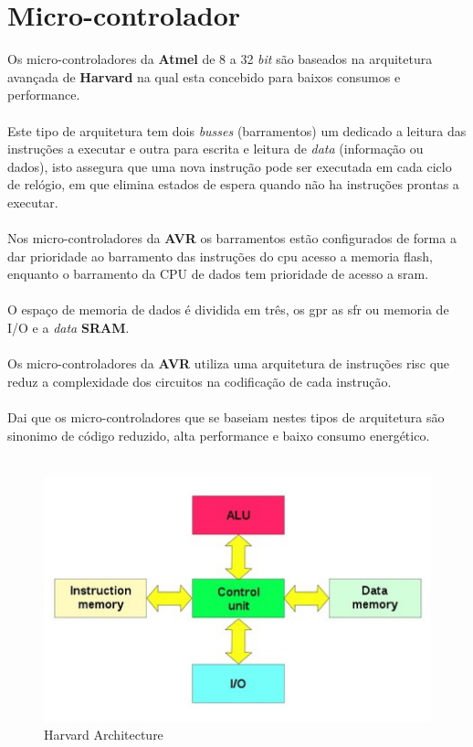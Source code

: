 \section{Micro-controlador}
Os micro-controladores da \textbf{Atmel} de 8 a 32 \textit{bit} são baseados na arquitetura avançada de \textbf{Harvard} na qual esta concebido para baixos consumos e performance.
\\
\\
Este tipo de arquitetura tem dois  \textit{busses} (barramentos) um dedicado a leitura das instruções a executar e outra para escrita e leitura de \textit{data} (informação ou dados), isto assegura que uma nova instrução pode ser executada em cada ciclo de relógio, em que elimina estados de espera quando não ha instruções prontas a executar.
\\
\\
Nos micro-controladores da \textbf{AVR} os barramentos estão configurados de forma a dar prioridade ao barramento das instruções do \ac{cpu} acesso a memoria flash, enquanto o barramento da CPU de dados tem prioridade de acesso a \ac{sram}.
\\
\\
O espaço de memoria de dados é dividida em três, os \ac{gpr} as \ac{sfr} ou memoria de I/O e a \textit{data} \textbf{SRAM}.
\\
\\
Os micro-controladores da \textbf{AVR} utiliza uma arquitetura de instruções \ac{risc} que reduz a complexidade dos circuitos na codificação de cada instrução.
\\
\\
Dai que os micro-controladores que se baseiam nestes tipos de arquitetura são sinonimo de código reduzido, alta performance e baixo consumo energético.
\\
\\
\begin{figure}[H]
	\centering
	\includegraphics[scale=1]{./image/PESTA/Diagrama/Harvard_architecture.jpg}
	\caption{Harvard Architecture}
	\label{Harvard_architecture}
\end{figure}
